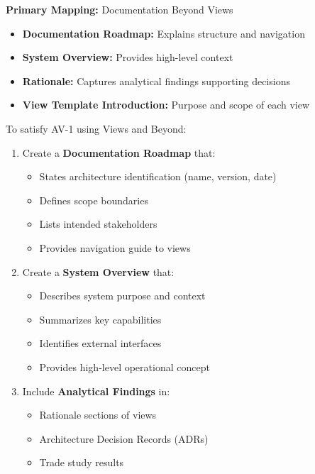 \documentclass[11pt]{article}
\begin{document}
\begin{vbbox}
\textbf{Primary Mapping:} Documentation Beyond Views

\begin{itemize}
    \item \textbf{Documentation Roadmap:} Explains structure and navigation
    \item \textbf{System Overview:} Provides high-level context
    \item \textbf{Rationale:} Captures analytical findings supporting decisions
    \item \textbf{View Template Introduction:} Purpose and scope of each view
\end{itemize}
\end{vbbox}

\begin{mappingbox}
To satisfy AV-1 using Views and Beyond:

\begin{enumerate}
    \item Create a \textbf{Documentation Roadmap} that:
    \begin{itemize}[nosep]
        \item States architecture identification (name, version, date)
        \item Defines scope boundaries
        \item Lists intended stakeholders
        \item Provides navigation guide to views
    \end{itemize}

    \item Create a \textbf{System Overview} that:
    \begin{itemize}[nosep]
        \item Describes system purpose and context
        \item Summarizes key capabilities
        \item Identifies external interfaces
        \item Provides high-level operational concept
    \end{itemize}

    \item Include \textbf{Analytical Findings} in:
    \begin{itemize}[nosep]
        \item Rationale sections of views
        \item Architecture Decision Records (ADRs)
        \item Trade study results
    \end{itemize}
\end{enumerate}
\end{mappingbox}
\end{document}
